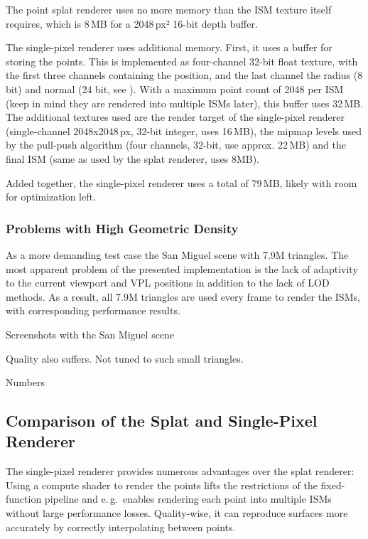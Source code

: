 The point splat renderer uses no more memory than the ISM texture itself requires, which is 8\,MB for a 2048\,px² 16-bit depth buffer.

The single-pixel renderer uses additional memory. First, it uses a buffer for storing the points. This is implemented as four-channel 32-bit float texture, with the first three channels containing the position, and the last channel the radius (8 bit) and normal (24 bit, see \cite{Cigolle:2014:NormalPacking}). With a maximum point count of 2048 per ISM (keep in mind they are rendered into multiple ISMs later), this buffer uses 32\,MB.
The additional textures used are the render target of the single-pixel renderer (single-channel 2048x2048\,px, 32-bit integer, uses 16\,MB), the mipmap levels used by the pull-push algorithm (four channels, 32-bit, use approx. 22\,MB) and the final ISM (same as used by the splat renderer, uses 8MB).

Added together, the single-pixel renderer uses a total of 79\,MB, likely with room for optimization left.


\subsubsection{Problems with High Geometric Density}
\label{sec:results:ism:densityProblems}

As a more demanding test case the San Miguel scene with 7.9M triangles. The most apparent problem of the presented implementation is the lack of adaptivity to the current viewport and VPL positions in addition to the lack of LOD methods. As a result, all 7.9M triangles are used every frame to render the ISMs, with corresponding performance results.

Screenshots with the San Miguel scene

Quality also suffers. Not tuned to such small triangles.

Numbers


\subsection{Comparison of the Splat and Single-Pixel Renderer}
\label{sec:results:ism:comparison}


The single-pixel renderer provides numerous advantages over the splat renderer: Using a compute shader to render the points lifts the restrictions of the fixed-function pipeline and e.\,g.\ enables rendering each point into multiple ISMs without large performance losses. Quality-wise, it can reproduce surfaces more accurately by correctly interpolating between points.

